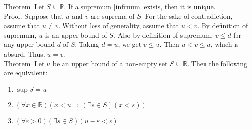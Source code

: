\documentclass{article}
\newcommand{\reals}{\mathbb{R}}
\begin{document}
Theorem. Let $S \subseteq \reals$. If a supremum [infimum] exists, then it is unique. \\
Proof. Suppose that $u$ and $v$ are suprema of $S$. For the sake of contradiction, assume that $u \neq v$. Without loss of generality, assume that $u < v$. By definition of supremum, $u$ is an upper bound of $S$. Also by definition of supremum, $v \leq d$ for any upper bound $d$ of $S$. Taking $d = u$, we get $v \leq u$. Then $u < v \leq u$, which is absurd. Thus, $u = v$. \\
Theorem. Let $u$ be an upper bound of a non-empty set $S \subseteq \reals$. Then the following are equivalent:
\begin{enumerate}
	\item
		$\sup S = u$
	\item
		$(\forall x \in \reals)(x < u \Rightarrow (\exists s \in S)(x < s))$
	\item
		$(\forall \varepsilon > 0)(\exists s \in S)(u - \varepsilon < s)$
\end{enumerate}
\end{document}
